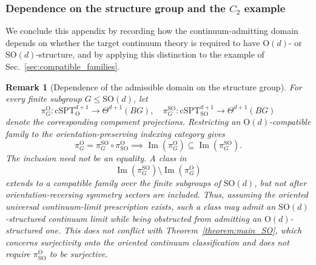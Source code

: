 \documentclass[aps,prx,reprint,superscriptaddress,twocolumn,amsmath,amssymb,amsfonts, nofootinbib]{revtex4-2}
\theoremstyle{apsstyle}
\newtheorem{remark}[theorem]{Remark}
\begin{document}
\bigskip 

\subsubsection{Dependence on the structure group and the $C_2$ example}
\label{app:O_SO_admissible_domain_example}

We conclude this appendix by recording how the continuum-admitting domain depends on whether the target continuum theory is required to have $\mathrm O(d)$- or $\mathrm{SO}(d)$-structure, and by applying this distinction to the example of Sec.~\ref{sec:compatible_families}.

\begin{remark}[Dependence of the admissible domain on the structure group]
\label{rmk:O_SO_admissible_domains}
For every finite subgroup $G\leq\mathrm{SO}(d)$, let
\begin{equation*}
\pi_G^{\mathrm O}:
\mathrm{cSPT}^{d+1}_{\mathrm O}
\longrightarrow
\Theta^{d+1}(BG),
\quad
\pi_G^{\mathrm{SO}}:
\mathrm{cSPT}^{d+1}_{\mathrm{SO}}
\longrightarrow
\Theta^{d+1}(BG)
\end{equation*}
denote the corresponding component projections. Restricting an
$\mathrm O(d)$-compatible family to the orientation-preserving
indexing category gives
\begin{equation}
\pi_G^{\mathrm O}
=
\pi_G^{\mathrm{SO}}
\circ
\pi_{\mathrm{SO}}^{\mathrm O} \implies 
\operatorname{Im}(\pi_G^{\mathrm O})
\subseteq
\operatorname{Im}(\pi_G^{\mathrm{SO}}).
\label{eq:O_SO_domain_inclusion}
\end{equation}
The inclusion need not be an equality. A class in
\begin{equation*}
\operatorname{Im}(\pi_G^{\mathrm{SO}})
\setminus
\operatorname{Im}(\pi_G^{\mathrm O})
\end{equation*}
extends to a compatible family over the finite subgroups of
$\mathrm{SO}(d)$, but not after orientation-reversing symmetry sectors
are included. Thus, assuming the oriented universal continuum-limit
prescription exists, such a class may admit an
$\mathrm{SO}(d)$-structured continuum limit while being obstructed
from admitting an $\mathrm O(d)$-structured one. This does not
conflict with Theorem~\ref{theorem:main_SO}, which concerns
surjectivity onto the oriented continuum classification and does not
require $\pi_{\mathrm{SO}}^{\mathrm O}$ to be surjective.
\end{remark}
\end{document}
